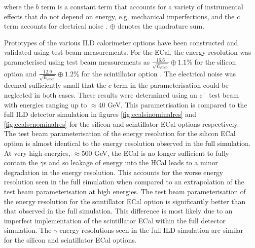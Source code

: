 \noindent where the $b$ term is a constant term that accounts for a variety of instrumental effects that do not depend on energy, e.g. mechanical imperfections, and the $c$ term accounts for electrical noise \cite{Fabjan:2003aq}.  $\oplus$ denotes the quadrature sum.  

Prototypes of the various ILD calorimeter options have been constructed and validated using test beam measurements.  For the ECal, the energy resolution was parameterised using test beam measurements as $\frac{16.6}{\sqrt{E_{Reco}}} \oplus 1.1 \%$ for the silicon option and $\frac{12.9}{\sqrt{E_{Reco}}} \oplus 1.2 \%$ for the scintillator option \cite{Behnke:2013lya}.  The electrical noise was deemed sufficiently small that the $c$ term in the parameterisation could be neglected in both cases.  These results were determined using an $\text{e}^{-}$ test beam with energies ranging up to $\approx 40$ GeV.  This parametrisation is compared to the full ILD detector simulation in figures \ref{fig:ecalsinominalres} and \ref{fig:ecalscnominalres} for the silicon and scintillator ECal options respectively.  The test beam parameterisation of the energy resolution for the silicon ECal option is almost identical to the energy resolution observed in the full simulation.  At very high energies, $\approx 500$ GeV, the ECal is no longer sufficient to fully contain the $\gamma$s and so leakage of energy into the HCal leads to a minor degradation in the energy resolution.  This accounts for the worse energy resolution seen in the full simulation when compared to an extrapolation of the test beam parameterisation at high energies.  The test beam parameterisation of the energy resolution for the scintillator ECal option is significantly better than that observed in the full simulation.  This difference is most likely due to an imperfect implementation of the scintillator ECal within the full detector simulation.  The $\gamma$ energy resolutions seen in the full ILD simulation are similar for the silicon and scintillator ECal options.      

